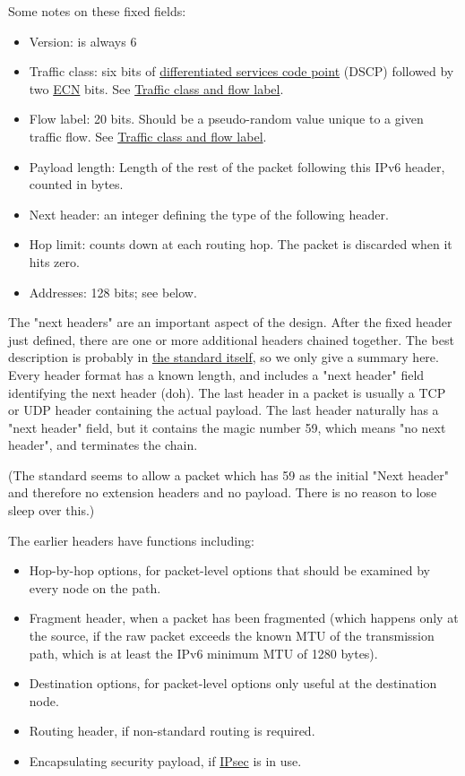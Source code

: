\documentclass[
]{article}
\begin{document}
Some notes on these fixed fields:

\begin{itemize}
\item
  Version: is always 6
\item
  Traffic class: six bits of
  \href{https://www.rfc-editor.org/info/rfc2474}{differentiated services
  code point} (DSCP) followed by two
  \href{https://www.rfc-editor.org/info/rfc3168}{ECN} bits. See
  \hyperref[traffic-class-and-flow-label]{Traffic class and flow label}.
\item
  Flow label: 20 bits. Should be a pseudo-random value unique to a given
  traffic flow. See \hyperref[traffic-class-and-flow-label]{Traffic
  class and flow label}.
\item
  Payload length: Length of the rest of the packet following this IPv6
  header, counted in bytes.
\item
  Next header: an integer defining the type of the following header.
\item
  Hop limit: counts down at each routing hop. The packet is discarded
  when it hits zero.
\item
  Addresses: 128 bits; see below.
\end{itemize}

The "next headers" are an important aspect of the design. After the
fixed header just defined, there are one or more additional headers
chained together. The best description is probably in
\href{https://www.rfc-editor.org/info/rfc8200}{the standard itself}, so
we only give a summary here. Every header format has a known length, and
includes a "next header" field identifying the next header
(d\textquotesingle oh). The last header in a packet is usually a TCP or
UDP header containing the actual payload. The last header naturally has
a "next header" field, but it contains the magic number 59, which means
"no next header", and terminates the chain.

(The standard seems to allow a packet which has 59 as the initial "Next
header" and therefore no extension headers and no payload. There is no
reason to lose sleep over this.)

The earlier headers have functions including:

\begin{itemize}
\item
  Hop-by-hop options, for packet-level options that should be examined
  by every node on the path.
\item
  Fragment header, when a packet has been fragmented (which happens only
  at the source, if the raw packet exceeds the known MTU of the
  transmission path, which is at least the IPv6 minimum MTU of 1280
  bytes).
\item
  Destination options, for packet-level options only useful at the
  destination node.
\item
  Routing header, if non-standard routing is required.
\item
  Encapsulating security payload, if
  \href{https://www.rfc-editor.org/info/rfc4303}{IPsec} is in use.
\end{itemize}
\end{document}
